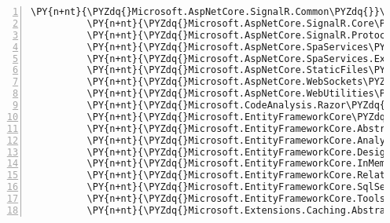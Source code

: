 \begin{Verbatim}[commandchars=\\\{\},numbers=left,firstnumber=1,stepnumber=1,numberblanklines=0]
          \PY{n+nt}{\PYZdq{}Microsoft.AspNetCore.SignalR.Common\PYZdq{}}\PY{p}{:} \PY{l+s+s2}{\PYZdq{}1.0.0\PYZhy{}rc1\PYZhy{}final\PYZdq{}}\PY{p}{,}
          \PY{n+nt}{\PYZdq{}Microsoft.AspNetCore.SignalR.Core\PYZdq{}}\PY{p}{:} \PY{l+s+s2}{\PYZdq{}1.0.0\PYZhy{}rc1\PYZhy{}final\PYZdq{}}\PY{p}{,}
          \PY{n+nt}{\PYZdq{}Microsoft.AspNetCore.SignalR.Protocols.Json\PYZdq{}}\PY{p}{:} \PY{l+s+s2}{\PYZdq{}1.0.0\PYZhy{}rc1\PYZhy{}final\PYZdq{}}\PY{p}{,}
          \PY{n+nt}{\PYZdq{}Microsoft.AspNetCore.SpaServices\PYZdq{}}\PY{p}{:} \PY{l+s+s2}{\PYZdq{}2.1.0\PYZhy{}rc1\PYZhy{}final\PYZdq{}}\PY{p}{,}
          \PY{n+nt}{\PYZdq{}Microsoft.AspNetCore.SpaServices.Extensions\PYZdq{}}\PY{p}{:} \PY{l+s+s2}{\PYZdq{}2.1.0\PYZhy{}rc1\PYZhy{}final\PYZdq{}}\PY{p}{,}
          \PY{n+nt}{\PYZdq{}Microsoft.AspNetCore.StaticFiles\PYZdq{}}\PY{p}{:} \PY{l+s+s2}{\PYZdq{}2.1.0\PYZhy{}rc1\PYZhy{}final\PYZdq{}}\PY{p}{,}
          \PY{n+nt}{\PYZdq{}Microsoft.AspNetCore.WebSockets\PYZdq{}}\PY{p}{:} \PY{l+s+s2}{\PYZdq{}2.1.0\PYZhy{}rc1\PYZhy{}final\PYZdq{}}\PY{p}{,}
          \PY{n+nt}{\PYZdq{}Microsoft.AspNetCore.WebUtilities\PYZdq{}}\PY{p}{:} \PY{l+s+s2}{\PYZdq{}2.1.0\PYZhy{}rc1\PYZhy{}final\PYZdq{}}\PY{p}{,}
          \PY{n+nt}{\PYZdq{}Microsoft.CodeAnalysis.Razor\PYZdq{}}\PY{p}{:} \PY{l+s+s2}{\PYZdq{}2.1.0\PYZhy{}rc1\PYZhy{}final\PYZdq{}}\PY{p}{,}
          \PY{n+nt}{\PYZdq{}Microsoft.EntityFrameworkCore\PYZdq{}}\PY{p}{:} \PY{l+s+s2}{\PYZdq{}2.1.0\PYZhy{}rc1\PYZhy{}final\PYZdq{}}\PY{p}{,}
          \PY{n+nt}{\PYZdq{}Microsoft.EntityFrameworkCore.Abstractions\PYZdq{}}\PY{p}{:} \PY{l+s+s2}{\PYZdq{}2.1.0\PYZhy{}rc1\PYZhy{}final\PYZdq{}}\PY{p}{,}
          \PY{n+nt}{\PYZdq{}Microsoft.EntityFrameworkCore.Analyzers\PYZdq{}}\PY{p}{:} \PY{l+s+s2}{\PYZdq{}2.1.0\PYZhy{}rc1\PYZhy{}final\PYZdq{}}\PY{p}{,}
          \PY{n+nt}{\PYZdq{}Microsoft.EntityFrameworkCore.Design\PYZdq{}}\PY{p}{:} \PY{l+s+s2}{\PYZdq{}2.1.0\PYZhy{}rc1\PYZhy{}final\PYZdq{}}\PY{p}{,}
          \PY{n+nt}{\PYZdq{}Microsoft.EntityFrameworkCore.InMemory\PYZdq{}}\PY{p}{:} \PY{l+s+s2}{\PYZdq{}2.1.0\PYZhy{}rc1\PYZhy{}final\PYZdq{}}\PY{p}{,}
          \PY{n+nt}{\PYZdq{}Microsoft.EntityFrameworkCore.Relational\PYZdq{}}\PY{p}{:} \PY{l+s+s2}{\PYZdq{}2.1.0\PYZhy{}rc1\PYZhy{}final\PYZdq{}}\PY{p}{,}
          \PY{n+nt}{\PYZdq{}Microsoft.EntityFrameworkCore.SqlServer\PYZdq{}}\PY{p}{:} \PY{l+s+s2}{\PYZdq{}2.1.0\PYZhy{}rc1\PYZhy{}final\PYZdq{}}\PY{p}{,}
          \PY{n+nt}{\PYZdq{}Microsoft.EntityFrameworkCore.Tools\PYZdq{}}\PY{p}{:} \PY{l+s+s2}{\PYZdq{}2.1.0\PYZhy{}rc1\PYZhy{}final\PYZdq{}}\PY{p}{,}
          \PY{n+nt}{\PYZdq{}Microsoft.Extensions.Caching.Abstractions\PYZdq{}}\PY{p}{:} \PY{l+s+s2}{\PYZdq{}2.1.0\PYZhy{}rc1\PYZhy{}final\PYZdq{}}\PY{p}{,}

\end{Verbatim}
